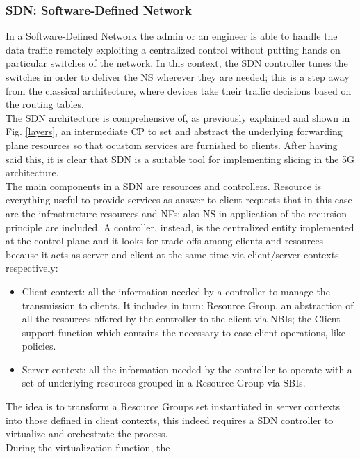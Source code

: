 \documentclass[a4paper,12pt]{report} %
\begin{document}
\subsubsection{SDN: Software-Defined Network}
In a Software-Defined Network the admin or an engineer is able to handle the data traffic remotely exploiting a centralized control without putting hands on particular switches of the network. In this context, the SDN controller tunes the switches in order to deliver the NS wherever they are needed; this is a step away from the classical architecture, where devices take their traffic decisions based on the routing tables.\\
The SDN architecture is comprehensive of, as previously explained and shown in Fig. \ref{layers}, an intermediate CP to set and abstract the underlying forwarding plane resources so that ocustom services are furnished to clients.  After having said this, it is clear that SDN is a suitable tool for implementing slicing in the 5G architecture.\\
The main components in a SDN are resources and controllers. Resource is everything useful to
provide services as answer to client requests that in this case are the infrastructure resources and NFs; also
NS in application of the recursion
principle are included. A controller, instead, is the centralized entity implemented at the control
plane and it looks for trade-offs among clients and resources because it acts as server and client at the same time via client/server contexts respectively:
\begin{itemize}
\item Client context: all the information needed by a
controller to manage the transmission to clients. It includes in turn: Resource Group, an abstraction of all the resources offered by the controller to the client via NBIs; the Client support function which contains the
necessary to ease client operations, like policies.
\end{itemize}
\begin{itemize}
\item Server context: all the information needed by the controller to operate with a set of
underlying resources grouped in a Resource
Group via SBIs.
\end{itemize}
The idea is to transform a Resource Groups set instantiated in server contexts into those defined in client contexts, this indeed requires a SDN controller to virtualize and orchestrate the process.\\
During the virtualization function, the
\end{document}

